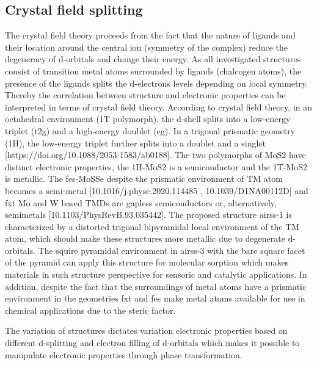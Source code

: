 \documentclass[a4paperm]{article}
\begin{document}
\subsection{Crystal field splitting}

The crystal field theory proceeds from the fact that the nature of ligands and their location around the central ion (symmetry of the complex) reduce the degeneracy of d-orbitals and change their energy. As all investigated structures consist of transition metal atoms surrounded by ligands (chalcogen atoms), the presence of the ligands splits the d-electrons levels depending on local symmetry. Thereby the correlation between structure and electronic properties can be interpreted in terms of crystal field theory. According to crystal field theory, in an octahedral environment (1T polymorph), the d-shell splits into a low-energy triplet (t2g) and a high-energy doublet (eg). In a trigonal prismatic geometry (1H), the low-energy triplet further splits into a doublet and a singlet [https://doi.org/10.1088/2053-1583/ab0188]. The two polymorphs of MoS2 have distinct electronic properties, the 1H-MoS2 is a semiconductor and the 1T-MoS2 is metallic. The fes-MoSSe despite the prismatic environment of TM atom becomes a semi-metal [10.1016/j.physe.2020.114485 , 10.1039/D1NA00112D] and fxt Mo and W based TMDs are gapless semiconductors or, alternatively, semimetals [10.1103/PhysRevB.93.035442]. The proposed structure airss-1 is characterized by a distorted trigonal bipyramidal local environment of the TM atom, which should make these structures more metallic due to degenerate d-orbitals. The squire pyramidal environment in airss-3 with the bare square facet of the pyramid can apply this structure for molecular sorption which makes materials in such structure perspective for sensoric and catalytic applications. In addition, despite the fact that the surroundings of metal atoms have a prismatic environment in the geometries fxt and fes make metal atoms available for use in chemical applications due to the steric factor.

The variation of structures dictates variation electronic properties based on different d-splitting and electron filling of d-orbitals which makes it possible to manipulate electronic properties through phase transformation.




\end{document}
